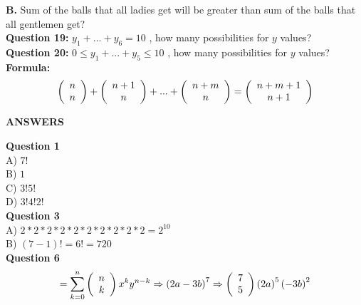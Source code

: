 \documentclass[11pt]{article}
\begin{document}
\textbf{B.} Sum of the balls that all ladies get will be greater than sum of the balls that all gentlemen get?
\\

\textbf{Question 19: } $y_1 + ... + y_6 = 10$ , how many possibilities for $y$ values?
\\ %
 
\textbf{Question 20: } $0 \leq y_1 + ... + y_5 \leq 10$ , how many possibilities for $y$ values?
\\ %

\textbf{Formula: } $$\left( {\begin{array}{*{20}c} n \\ n \\ \end{array}} \right) +  \left( 
{\begin{array}{*{20}c} n+1 \\ n \\ \end{array}} \right) + ... +  \left( {\begin{array}{*{20}c} n+m 
\\ n \\ \end{array}} \right) =  \left( {\begin{array}{*{20}c} n+m+1 \\ n+1 \\ \end{array}} 
\right)$$

\newpage

\begin{center}
\textbf{ANSWERS}
\end{center}

\textbf{Question 1} \\

A) $7!$ \\

B) $1$ \\

C) $3! 5!$ \\

D) $3! 4! 2!$ \\

\textbf{Question 3} \\

A) $2*2*2*2*2*2*2*2*2*2 = 2^{10}$ \\

B) $(7-1)! = 6! = 720$ \\

\textbf{Question 6}
$$= \sum\limits_{k = 0}^n {\left( {\begin{array}{*{20}c} n  \\ k  \\ \end{array}} \right) x^k y^{n-k}} \Rightarrow \left(2a-3b\right)^7 \Rightarrow \left( {\begin{array}{*{20}c} 7 \\ 5 \\ \end{array}} \right)\left(2a\right)^5\left(-3b\right)^2 $$
\end{document}
